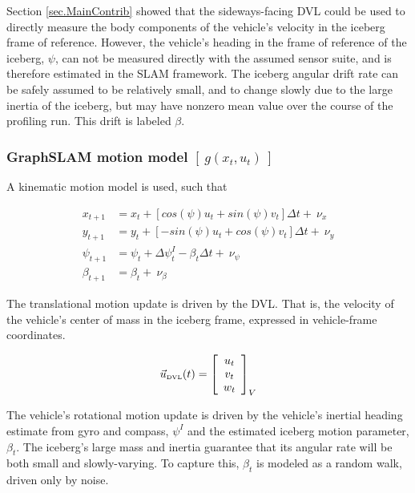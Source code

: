 Section \ref{sec.MainContrib} showed that the sideways-facing DVL could be used to directly measure the body components of the vehicle's velocity in the iceberg frame of reference. However, the vehicle's heading in the frame of reference of the iceberg, $\psi$, can not be measured directly with the assumed sensor suite, and is therefore estimated in the SLAM framework. The iceberg angular drift rate can be safely assumed to be relatively small, and to change slowly due to the large inertia of the iceberg, but may have nonzero mean value over the course of the profiling run. This drift is labeled $\beta$. 

\subsubsection{GraphSLAM motion model $\left[~g\left(x_t,u_t\right)~\right]$ }

A kinematic motion model is used, such that

\begin{align}
x_{t+1} &= x_t + \left[cos(\psi) u_t + sin(\psi)v_t\right]\Delta t +~ \nu_x\\
y_{t+1} &= y_t + \left[-sin(\psi) u_t + cos(\psi)v_t\right]\Delta t + ~\nu_y \\
\psi_{t+1}    &= \psi_{t} + \Delta\psi_t^I - \beta_t\Delta t + ~\nu_\psi \\
\beta_{t +1}   &= \beta_{t} + ~\nu_\beta
\end{align}


The translational motion update is driven by the DVL. That is, the velocity of the vehicle's center of mass in the iceberg frame, expressed in vehicle-frame coordinates. 

\begin{equation}
\vec{u}_\text{\tiny{DVL}}(t) = 
                    \left[\begin{array}{c}
                     u_t \\ v_t \\ w_t 
                     \end{array}\right]_V
\end{equation}

The vehicle's rotational motion update is driven by the vehicle's inertial heading estimate from gyro and compass, $\psi^I$ and the estimated iceberg motion parameter, $\beta_t$.  The iceberg's large mass and inertia guarantee that its angular rate will be both small and slowly-varying. To capture this, $\beta_t$ is modeled as a random walk, driven only by noise.

